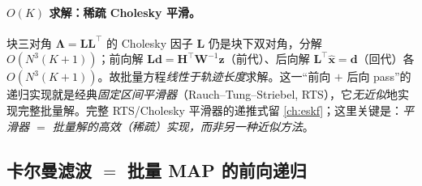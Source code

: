 \paragraph{$O(K)$ 求解：稀疏 Cholesky 平滑。}
块三对角 $\boldsymbol{\Lambda}=\mathbf{L}\mathbf{L}^\top$ 的 Cholesky 因子 $\mathbf{L}$ 仍是块下双对角，分解 $O(N^3(K+1))$；前向解 $\mathbf{L}\mathbf{d}=\mathbf{H}^\top\mathbf{W}^{-1}\mathbf{z}$（前代）、后向解 $\mathbf{L}^\top\hat{\mathbf{x}}=\mathbf{d}$（回代）各 $O(N^3(K+1))$。故批量方程\emph{线性于轨迹长度}求解。这一“前向 $+$ 后向 pass”的递归实现就是经典\emph{固定区间平滑器}（Rauch–Tung–Striebel, RTS），它\emph{无近似}地实现完整批量解\cite{barfoot2024state}。完整 RTS/Cholesky 平滑器的递推式留 \cref{ch:eskf}；这里关键是：\emph{平滑器 $=$ 批量解的高效（稀疏）实现，而非另一种近似方法}。

\subsection{卡尔曼滤波 $=$ 批量 MAP 的前向递归}
\label{sec:est-kf-from-map}

